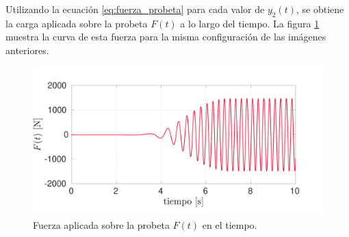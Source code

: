 %

Utilizando la ecuación \ref{eq:fuerza_probeta} para cada valor de $y_2(t)$, se obtiene la carga aplicada sobre la probeta $F(t)$ a lo largo del tiempo. La figura \ref{fig:f_2} muestra la curva de esta fuerza para la misma configuración de las imágenes anteriores.  

\begin{figure}[h]
\centering
\includegraphics[width=\linewidth, trim={0cm 1cm 2cm 1cm},clip]{Imagenes/f_2.pdf}
\caption{Fuerza aplicada sobre la probeta $F(t)$ en el tiempo.}
\label{fig:f_2}
\end{figure}
 
